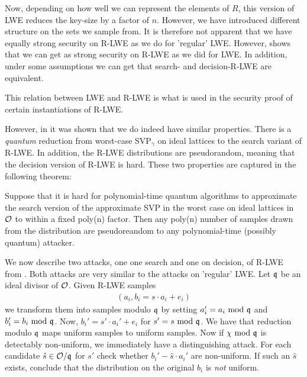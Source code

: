    Now, depending on how well we can represent the elements of \(R\), this version of LWE reduces the key-size by a factor of \(n\)\cite{First R-LWE}. However, we have introduced different structure on the sets we sample from. It is therefore not apparent that we have equally strong security on R-LWE as we do for 'regular' LWE. However, \cite{How Not To RLWE} shows that we can get as strong security on R-LWE as we did for LWE. In addition, under some assumptions we can get that search- and decision-R-LWE are equivalent.\par
    
    This relation between LWE and R-LWE is what is used in the security proof of certain instantiations of R-LWE. \par
    
    However, in \cite{First R-LWE} it was shown that we do indeed have similar properties. There is a \emph{quantum} reduction from worst-case SVP\(_\gamma\) on ideal lattices to the search variant of R-LWE. In addition, the R-LWE distributions are pseudorandom, meaning that the decision version of R-LWE is hard. These two properties are captured in the following theorem:
    \begin{theorem}
        Suppose that it is hard for polynomial-time quantum algorithms to approximate the search version of the approximate SVP in the worst case on ideal lattices in \(\mathcal{O}\) to within a fixed poly(n) factor. Then any poly(n) number of samples drawn from the distribution are pseudoreandom to any polynomial-time (possibly quantum) attacker.
    \end{theorem}
    
    We now describe two attacks, one one search and one on decision, of R-LWE from \cite{How Not To RLWE}. Both attacks are very similar to the attacks on 'regular' LWE. Let \(\mathfrak{q}\) be an ideal divisor of \(\mathcal{O}\). Given R-LWE samples
    \begin{align*}
        (a_i, b_i = s\cdot a_i + e_i)
    \end{align*}
    we transform them into samples modulo \(\mathfrak{q}\) by setting \(a_i' = a_i \text{ mod } \mathfrak{q}\) and \(b_i' = b_i \text{ mod } \mathfrak{q}\). Now, \(b_i' = s'\cdot a_i' + e_i\) for \(s' = s\text{ mod } \mathfrak{q}\). We have that reduction modulo \(\mathfrak{q}\) maps uniform samples to uniform samples. Now if \(\chi\text{ mod }\mathfrak{q}\) is detectably non-uniform, we immediately have a distinguishing attack. For each candidate \(\hat{s}\in \mathcal{O}/\mathfrak{q}\) for \(s'\) check whether \(b_i' - \hat{s}\cdot a_i'\) are non-uniform. If such an \(\hat{s}\) exists, conclude that the distribution on the original \(b_i\) is \emph{not} uniform.\par
    
